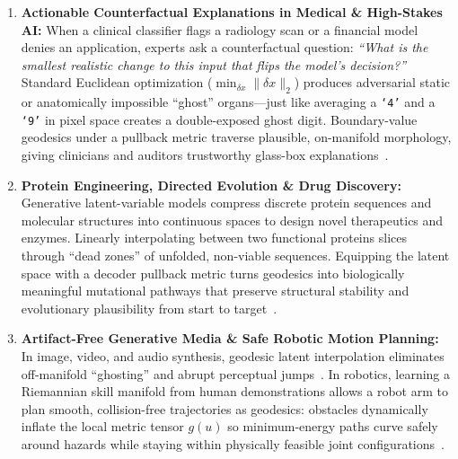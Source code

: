 \documentclass[11pt,a4paper]{article}
\theoremstyle{definition}
\begin{document}
\begin{enumerate}[leftmargin=*]
    \item \textbf{Actionable Counterfactual Explanations in Medical \& High-Stakes AI:}
    When a clinical classifier flags a radiology scan or a financial model denies an application, experts ask a counterfactual question: \emph{``What is the smallest realistic change to this input that flips the model's decision?''} Standard Euclidean optimization ($\min_{\delta x}\|\delta x\|_2$) produces adversarial static or anatomically impossible ``ghost'' organs---just like averaging a \texttt{`4'} and a \texttt{`9'} in pixel space creates a double-exposed ghost digit. Boundary-value geodesics under a pullback metric traverse plausible, on-manifold morphology, giving clinicians and auditors trustworthy glass-box explanations~\cite{arvanitidis2018oddity,wurgaft2026manifold}.

    \item \textbf{Protein Engineering, Directed Evolution \& Drug Discovery:}
    Generative latent-variable models compress discrete protein sequences and molecular structures into continuous spaces to design novel therapeutics and enzymes. Linearly interpolating between two functional proteins slices through ``dead zones'' of unfolded, non-viable sequences. Equipping the latent space with a decoder pullback metric turns geodesics into biologically meaningful mutational pathways that preserve structural stability and evolutionary plausibility from start to target~\cite{detlefsen2022protein}.

    \item \textbf{Artifact-Free Generative Media \& Safe Robotic Motion Planning:}
    In image, video, and audio synthesis, geodesic latent interpolation eliminates off-manifold ``ghosting'' and abrupt perceptual jumps~\cite{arvanitidis2018oddity,hauberg2019onlybayes}. In robotics, learning a Riemannian skill manifold from human demonstrations allows a robot arm to plan smooth, collision-free trajectories as geodesics: obstacles dynamically inflate the local metric tensor $g(u)$ so minimum-energy paths curve safely around hazards while staying within physically feasible joint configurations~\cite{beikmohammadi2021robotics}.
\end{enumerate}
\end{document}
